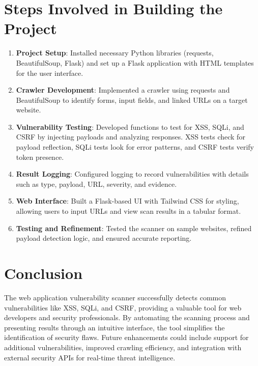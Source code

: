 \documentclass[a4paper,12pt]{article}
\begin{document}
\section{Steps Involved in Building the Project}
\begin{enumerate}
    \item \textbf{Project Setup}: Installed necessary Python libraries (requests, BeautifulSoup, Flask) and set up a Flask application with HTML templates for the user interface.
    \item \textbf{Crawler Development}: Implemented a crawler using requests and BeautifulSoup to identify forms, input fields, and linked URLs on a target website.
    \item \textbf{Vulnerability Testing}: Developed functions to test for XSS, SQLi, and CSRF by injecting payloads and analyzing responses. XSS tests check for payload reflection, SQLi tests look for error patterns, and CSRF tests verify token presence.
    \item \textbf{Result Logging}: Configured logging to record vulnerabilities with details such as type, payload, URL, severity, and evidence.
    \item \textbf{Web Interface}: Built a Flask-based UI with Tailwind CSS for styling, allowing users to input URLs and view scan results in a tabular format.
    \item \textbf{Testing and Refinement}: Tested the scanner on sample websites, refined payload detection logic, and ensured accurate reporting.
\end{enumerate}

\section{Conclusion}
The web application vulnerability scanner successfully detects common vulnerabilities like XSS, SQLi, and CSRF, providing a valuable tool for web developers and security professionals. By automating the scanning process and presenting results through an intuitive interface, the tool simplifies the identification of security flaws. Future enhancements could include support for additional vulnerabilities, improved crawling efficiency, and integration with external security APIs for real-time threat intelligence.
\end{document}

